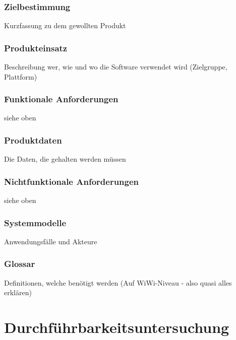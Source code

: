 \documentclass[a4paper]{article}
\theoremstyle{break}
\begin{document}
\subsubsection{Zielbestimmung}
Kurzfassung zu dem gewollten Produkt
\subsubsection{Produkteinsatz}
Beschreibung wer, wie und wo die Software verwendet wird (Zielgruppe, Plattform)
\subsubsection{Funktionale Anforderungen}
siehe oben
\subsubsection{Produktdaten}
Die Daten, die gehalten werden müssen
\subsubsection{Nichtfunktionale Anforderungen}
siehe oben
\subsubsection{Systemmodelle}
Anwendungsfälle und Akteure
\subsubsection{Glossar}
Definitionen, welche benötigt werden (Auf WiWi-Niveau - also quasi alles erklären)
\newpage
\section{Durchführbarkeitsuntersuchung}
\end{document}
